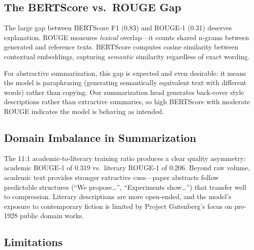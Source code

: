 \documentclass[11pt,a4paper]{article}
\begin{document}
\subsection{The BERTScore vs.\ ROUGE Gap}

The large gap between BERTScore F1 (0.83) and ROUGE-1 (0.31) deserves explanation.
ROUGE measures \emph{lexical} overlap---it counts shared n-grams between generated and reference texts.
BERTScore computes cosine similarity between contextual embeddings, capturing \emph{semantic} similarity regardless of exact wording.

For abstractive summarization, this gap is expected and even desirable: it means the model is paraphrasing (generating semantically equivalent text with different words) rather than copying.
Our summarization head generates back-cover style descriptions rather than extractive summaries, so high BERTScore with moderate ROUGE indicates the model is behaving as intended.

\subsection{Domain Imbalance in Summarization}

The 11:1 academic-to-literary training ratio produces a clear quality asymmetry: academic ROUGE-1 of 0.319 vs.\ literary ROUGE-1 of 0.206.
Beyond raw volume, academic text provides stronger extractive cues---paper abstracts follow predictable structures (``We propose\ldots'', ``Experiments show\ldots'') that transfer well to compression.
Literary descriptions are more open-ended, and the model's exposure to contemporary fiction is limited by Project Gutenberg's focus on pre-1928 public domain works.

\subsection{Limitations}
\end{document}

